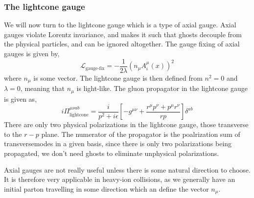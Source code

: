 \documentclass[main.tex]{subfiles}
\begin{document}
\subsubsection*{The lightcone gauge}
We will now turn to the lightcone gauge which is a type of axial gauge. Axial gauges violate Lorentz invariance, and makes it such that ghosts decouple from the physical particles, and can be ignored altogether. The gauge fixing of axial gauges is given by, 
\begin{equation}\label{eqn: gauge_fixing_axial}
    \mathcal{L}_{\text{gauge-fix}} = -\frac{1}{2\lambda} \left(n_\mu A_i^\mu(x)\right)^2 
\end{equation}
where \(n_\mu\) is some vector. The lightcone gauge is then defined from \(n^2 = 0\) and \(\lambda = 0\), meaning that \(n_\mu\) is light-like. The gluon propagator in the lightcone gauge is given as,
\begin{equation}\label{eqn: gluon_propagator_lightcone}
    i \Pi_{\text{lightcone}}^{\mu\nu ab} = \frac{i}{p^2+i\epsilon} \left[-g^{\mu\nu}+ \frac{r^\mu p^\nu+p^\mu r^\nu}{rp} \right]\delta^{ab}
\end{equation}
There are only two physical polarizations in the lightcone gauge, those transverse to the \(r-p\) plane. The numerator of the propagator is the poalrization sum of transversemodes in a given basis, since there is only two polarizations being propagated, we don't need ghosts to eliminate unphysical polarizations.  

Axial gauges are not really useful unless there is some natural direction to choose. It is therefore very applicable in heavy-ion collisions, as we generally have an initial parton travelling in some direction which an define the vector \(n_\mu\). 
\end{document}
